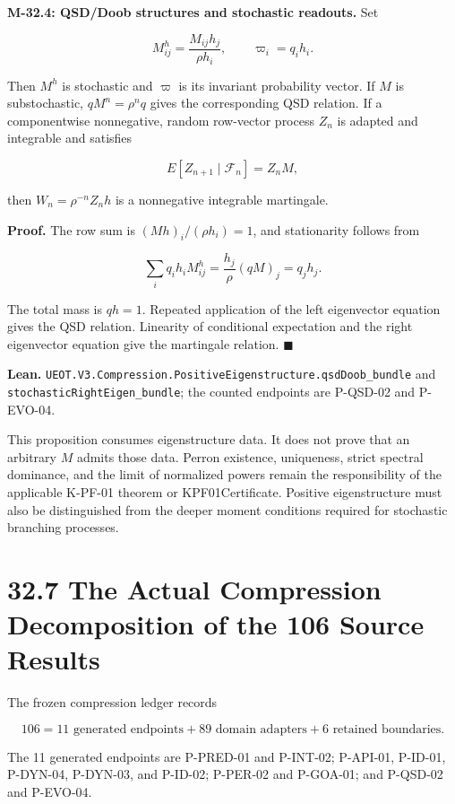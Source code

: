 \documentclass[
  english,
  11pt,
  oneside]{book}
\begin{document}
\textbf{M-32.4: QSD/Doob structures and stochastic readouts.} Set

\[M^h_{ij}=\frac{M_{ij}h_j}{\rho h_i},\qquad \varpi_i=q_ih_i.\]

Then \(M^h\) is stochastic and \(\varpi\) is its invariant probability vector. If \(M\) is substochastic, \(qM^n=\rho^nq\) gives the corresponding QSD relation. If a componentwise nonnegative, random row-vector process \(Z_n\) is adapted and integrable and satisfies

\[E[Z_{n+1}\mid\mathcal F_n]=Z_nM,\]

then \(W_n=\rho^{-n}Z_nh\) is a nonnegative integrable martingale.

\textbf{Proof.} The row sum is \((Mh)_i/(\rho h_i)=1\), and stationarity follows from

\[\sum_iq_ih_iM^h_{ij}=\frac{h_j}{\rho}(qM)_j=q_jh_j.\]

The total mass is \(qh=1\). Repeated application of the left eigenvector equation gives the QSD relation. Linearity of conditional expectation and the right eigenvector equation give the martingale relation. \(\blacksquare\)

\textbf{Lean.} \nolinkurl{UEOT.V3.Compression.PositiveEigenstructure.qsdDoob_bundle} and \nolinkurl{stochasticRightEigen_bundle}; the counted endpoints are P-QSD-02 and P-EVO-04.

This proposition consumes eigenstructure data. It does not prove that an arbitrary \(M\) admits those data. Perron existence, uniqueness, strict spectral dominance, and the limit of normalized powers remain the responsibility of the applicable K-PF-01 theorem or KPF01Certificate. Positive eigenstructure must also be distinguished from the deeper moment conditions required for stochastic branching processes.

\section{32.7 The Actual Compression Decomposition of the 106 Source Results}\label{the-actual-compression-decomposition-of-the-106-source-results}

The frozen compression ledger records

\[106=11\text{ generated endpoints}+89\text{ domain adapters}+6\text{ retained boundaries}.\]

The 11 generated endpoints are P-PRED-01 and P-INT-02; P-API-01, P-ID-01, P-DYN-04, P-DYN-03, and P-ID-02; P-PER-02 and P-GOA-01; and P-QSD-02 and P-EVO-04.
\end{document}
